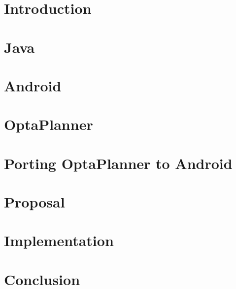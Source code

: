 \chapter{Introduction}\label{IntroductionChapter}


\chapter{Java}\label{JavaChapter}


\chapter{Android}\label{AndroidChapter}


\chapter{OptaPlanner}\label{OptaPlannerChapter}


\chapter{Porting OptaPlanner to Android}\label{PortingChapter}


\chapter{Proposal}\label{ProposalChapter}


\chapter{Implementation}\label{ImplementationChapter}


\chapter{Conclusion}\label{ConclusionChapter}


